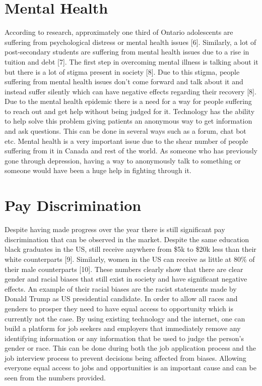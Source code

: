 \documentclass{article}
\begin{document}
\section{Mental Health}
According to research, approximately one third of Ontario adolescents are suffering from psychological distress or mental health issues [6]. Similarly, a lot of post-secondary students are suffering from mental health issues due to a rise in tuition and debt [7]. The first step in overcoming mental illness is talking about it but there is a lot of stigma present in society [8]. Due to this stigma, people suffering from mental health issues don't come forward and talk about it and instead suffer silently which can have negative effects regarding their recovery [8]. Due to the mental health epidemic there is a need for a way for people suffering to reach out and get help without being judged for it. Technology has the ability to help solve this problem giving patients an anonymous way to get information and ask questions. This can be done in several ways such as a forum, chat bot etc. Mental health is a very important issue due to the shear number of people suffering from it in Canada and rest of the world. As someone who has previously gone through depression, having a way to anonymously talk to something or someone would have been a huge help in fighting through it.

\section{Pay Discrimination}
Despite having made progress over the year there is still significant pay discrimination that can be observed in the market. Despite the same education black graduates in the US, still receive anywhere from \$5k to \$20k less than their white counterparts [9]. Similarly, women in the US can receive as little at 80\% of their male counterparts [10]. These numbers clearly show that there are clear gender and racial biases that still exist in society and have significant negative effects. An example of their racial biases are the racist statements made by Donald Trump as US presidential candidate. In order to allow all races and genders to prosper they need to have equal access to opportunity which is currently not the case. By using existing technology and the internet, one can build a platform for job seekers and employers that immediately remove any identifying information or any information that be used to judge the person's gender or race. This can be done during both the job application process and the job interview process to prevent decisions being affected from biases. Allowing everyone equal access to jobs and opportunities is an important cause and can be seen from the numbers provided.
\end{document}
